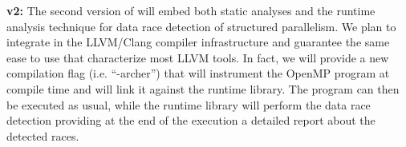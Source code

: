 \textbf{\archer v2:} The second version of \archer will embed both static
analyses and the runtime analysis technique for data race detection of
structured parallelism.
%
We plan to integrate \archer in the LLVM/Clang compiler infrastructure and
guarantee the same ease to use that characterize most LLVM tools.
%
In fact, we will provide a new compilation flag (i.e. ``-archer'') that will
instrument the OpenMP program at compile time and will link it against the
\archer runtime library.
%
The program can then be executed as usual, while the \archer runtime library
will perform the data race detection providing at the end of the execution a
detailed report about the detected races.

